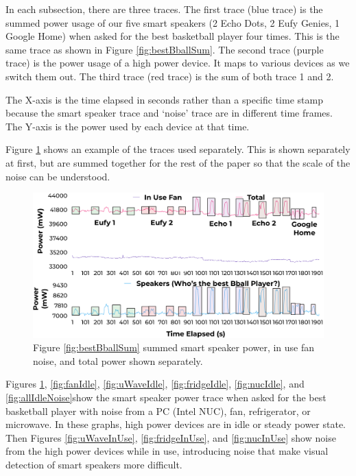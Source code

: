 In each subsection, there are three traces. The first trace (blue trace) is the summed power usage of our five smart speakers (2 Echo Dots, 2 Eufy Genies, 1 Google Home) when asked for the best basketball player four times. This is the same trace as shown in Figure \ref{fig:bestBballSum}. The second trace (purple trace) is the power usage of a high power device. It maps to various devices as we switch them out. The third trace (red trace) is the sum of both trace 1 and 2.

The X-axis is the time elapsed in seconds rather than a specific time stamp because the smart speaker trace and `noise' trace are in different time frames. The Y-axis is the power used by each device at that time.

Figure \ref{fig:fanIdleSeperate} shows an example of the traces used separately. This is shown separately at first, but are summed together for the rest of the paper so that the scale of the noise can be understood.

\begin{figure}[H]
  \centering
  \includegraphics[width=1\textwidth]{figures/inUseFanNoiseSeperate.png}
  \caption{Figure \ref{fig:bestBballSum} summed smart speaker power, in use fan noise, and total power shown separately.}
  \label{fig:fanIdleSeperate}
\end{figure}

Figures \ref{fig:fanIdleSeperate}, \ref{fig:fanIdle}, \ref{fig:uWaveIdle}, \ref{fig:fridgeIdle}, \ref{fig:nucIdle}, and \ref{fig:allIdleNoise}show the smart speaker power trace when asked for the best basketball player with noise from a PC (Intel NUC), fan, refrigerator, or microwave. In these graphs, high power devices are in idle or steady power state. Then Figures \ref{fig:uWaveInUse}, \ref{fig:fridgeInUse}, and \ref{fig:nucInUse} show noise from the high power devices while in use, introducing noise that make visual detection of smart speakers more difficult.

